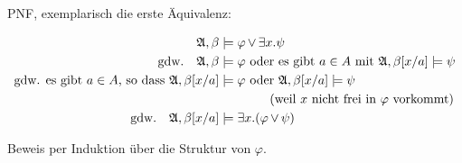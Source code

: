 PNF, exemplarisch die erste Äquivalenz:

\begin{align}
  \mathfrak{A}, \beta &\models \varphi \operatorname{\vee} \exists x.\psi \\
  \text{gdw.}\quad \mathfrak{A}, \beta &\models \varphi\ \text{oder es gibt}\ a\in A\ \text{mit}\ \mathfrak{A}, \beta[x/a] \models \psi \\
  \text{gdw. es gibt $a\in A$, so dass}\ \mathfrak{A}, \beta[x/a] &\models \varphi\ \text{oder}\ \mathfrak{A}, \beta[x/a] \models \psi\\
      & \qquad\qquad\text{(weil $x$ nicht frei in $\varphi$ vorkommt)} \\
  \text{gdw.}\quad \mathfrak{A}, \beta[x/a] &\models \exists x.(\varphi \operatorname{\vee} \psi)
\end{align}

Beweis per Induktion über die Struktur von $\varphi$.
